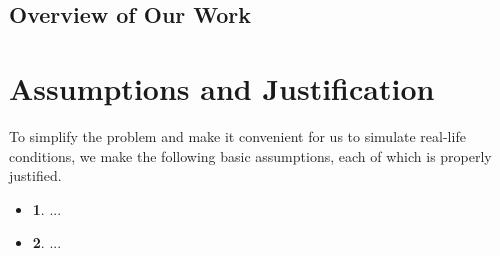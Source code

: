 \documentclass{mcmthesis}
\begin{document}
\subsection{Overview of Our Work}

%	
%	








\section{Assumptions and Justification}

To simplify the problem and make it convenient for us to simulate real-life 
conditions, we make the following basic assumptions, each of which is properly 
justified.

\begin{itemize}
	\item {\bf 1}. ...
	\item {\bf 2}. ...	
\end{itemize}










\end{document}
